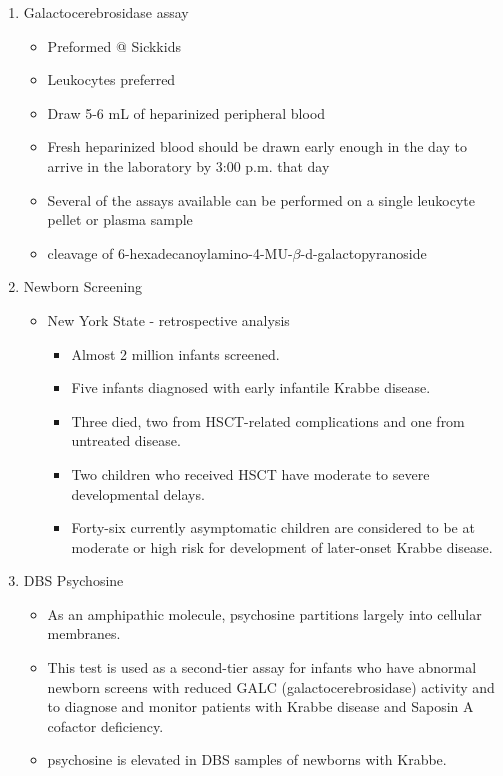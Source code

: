 \documentclass{scrartcl}
\begin{document}
\begin{enumerate}
\begin{enumerate}
\item Galactocerebrosidase assay
\label{sec:org5368013}
\begin{itemize}
\item Preformed @ Sickkids
\item Leukocytes preferred
\item Draw 5-6 mL of heparinized peripheral blood
\item Fresh heparinized blood should be drawn early enough in the day to arrive in the laboratory by 3:00 p.m. that day
\item Several of the assays available can be performed on a single leukocyte pellet or plasma sample
\item cleavage of 6-hexadecanoylamino-4-MU-\(\beta\)-d-galactopyranoside
\end{itemize}
\item Newborn Screening
\label{sec:orge7b6efd}
\begin{itemize}
\item New York State - retrospective analysis
\begin{itemize}
\item Almost 2 million infants screened.
\item Five infants diagnosed with early infantile Krabbe disease.
\item Three died, two from HSCT-related complications and one from untreated disease.
\item Two children who received HSCT have moderate to severe developmental delays.
\item Forty-six currently asymptomatic children are considered to be at
moderate or high risk for development of later-onset Krabbe disease.
\end{itemize}
\end{itemize}




\item DBS Psychosine
\label{sec:org349271b}
\begin{itemize}
\item As an amphipathic molecule, psychosine partitions largely into
cellular membranes.
\item This test is used as a second-tier assay for infants who have
abnormal newborn screens with reduced GALC (galactocerebrosidase)
activity and to diagnose and monitor patients with Krabbe disease
and Saposin A cofactor deficiency.

\item psychosine is elevated in DBS samples of newborns with Krabbe.


\end{itemize}
\end{enumerate}
\end{enumerate}
\end{document}
